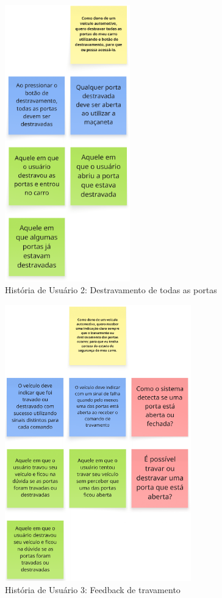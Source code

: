 \begin{figure}[ht]
\centering
\includegraphics[height=12cm]{figuras/user_story_2.png}
\caption{História de Usuário 2: Destravamento de todas as portas}
\end{figure}

\begin{figure}[ht]
\centering
\includegraphics[height=12cm]{figuras/user_story_3.png}
\caption{História de Usuário 3: Feedback de travamento}
\end{figure}

